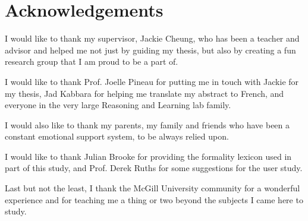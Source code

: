 \chapter*{Acknowledgements}

I would like to thank my supervisor, Jackie Cheung, who has been a teacher and advisor and helped me not just by guiding my thesis, but also by creating a fun research group that I am proud to be a part of.

I would like to thank Prof. Joelle Pineau for putting me in touch with Jackie for my thesis, Jad Kabbara for helping me translate my abstract to French, and everyone in the very large Reasoning and Learning lab family.

I would also like to thank my parents, my family and friends who have been a constant emotional support system, to be always relied upon.

I would like to thank Julian Brooke for providing the formality lexicon used in part of this study, and Prof. Derek Ruths for some suggestions for the user study.

Last but not the least, I thank the McGill University community for a wonderful experience and for teaching me a thing or two beyond the subjects I came here to study.  